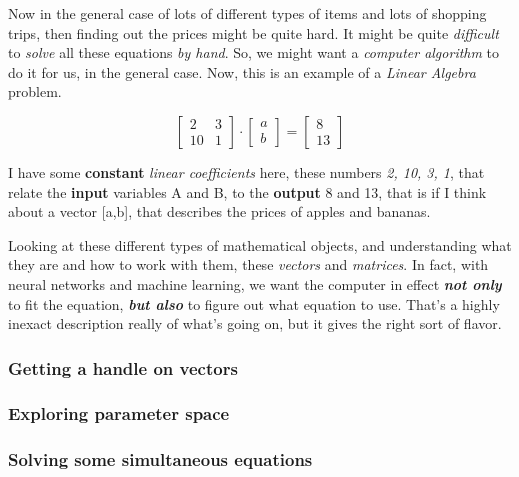 \documentclass{article}
\begin{document}
Now in the general case of lots of different types of items and lots of shopping trips, then finding out the prices might be quite hard. It might be quite \textit{difficult} to \textit{solve} all these equations \textit{by hand}. So, we might want a \textit{computer algorithm} to do it for us, in the general case. Now, this is an example of a \textit{Linear Algebra} problem.

\begin{equation} \label{eq2}
	\begin{bmatrix}
	2 & 3 \\
	10 & 1
	\end{bmatrix}
	\cdot
	\begin{bmatrix}
	a \\
	b
	\end{bmatrix}
	=
	\begin{bmatrix}
	8 \\
	13
	\end{bmatrix}
\end{equation}

I have some \textbf{constant} \textit{linear coefficients} here, these numbers \textit{2, 10, 3, 1}, that relate the \textbf{input} variables A and B, to the \textbf{output} 8 and 13, that is if I think about a vector [a,b], that describes the prices of apples and bananas.

Looking at these different types of mathematical objects, and understanding what they are and how to work with them, these \textit{vectors} and \textit{matrices}. In fact, with neural networks and machine learning, we want the computer in effect \textbf{\textit{not only}} to fit the equation, \textbf{\textit{but also}} to figure out what equation to use. That's a highly inexact description really of what's going on, but it gives the right sort of flavor.

\subsubsection{Getting a handle on vectors}

\subsubsection{Exploring parameter space}

\subsubsection{Solving some simultaneous equations}
\end{document}
